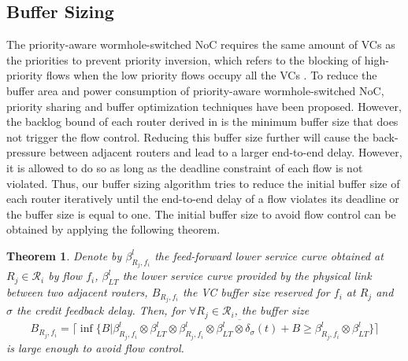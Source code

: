 \documentclass[preprint]{elsarticle}
\newtheorem{thm}{Theorem}
\begin{document}
\subsection{Buffer Sizing}\label{bufferopt}
The priority-aware wormhole-switched NoC \cite{Shi:2008:RCA:1397757.1397996,708526,627905} requires the same amount of VCs as the priorities to prevent priority inversion, which refers to the blocking of high-priority flows when the low priority flows occupy all the VCs \cite{707545}. To reduce the buffer area and power consumption of priority-aware wormhole-switched NoC, priority sharing \cite{5161497} and buffer optimization \cite{189} techniques have been proposed. However, the backlog bound of each router derived in \cite{189} is the minimum buffer size that does not trigger the flow control. Reducing this buffer size further will cause the back-pressure between adjacent routers and lead to a larger end-to-end delay. However, it is allowed to do so as long as the deadline constraint of each flow is not violated. Thus, our buffer sizing algorithm tries to reduce the initial buffer size of each router iteratively until the end-to-end delay of a flow violates its deadline or the buffer size is equal to one. The initial buffer size to avoid flow control can be obtained by applying the following theorem.
\begin{thm}\label{initial}
Denote by $\beta_{R_j,f_i}^l$ the feed-forward lower service curve obtained at $R_j\in\mathcal{R}_i$ by flow $f_i$, $\beta_{LT}^l$ the lower service curve provided by the physical link between two adjacent routers, $B_{R_j,f_i}$ the VC buffer size reserved for $f_i$ at $R_j$ and $\sigma$ the credit feedback delay. Then, for $\forall R_j\in\mathcal{R}_i$, the buffer size $$B_{R_j,f_i}=\lceil\inf\{B|\beta_{R_j,f_i}^l\otimes\beta_{LT}^l\otimes\overline{\beta_{R_j,f_i}^l\otimes\beta_{LT}^l\otimes\delta_\sigma(t)+B}\geq\beta_{R_j,f_i}^l\otimes\beta_{LT}^l\}\rceil$$
is large enough to avoid flow control.
\end{thm}
\end{document}
